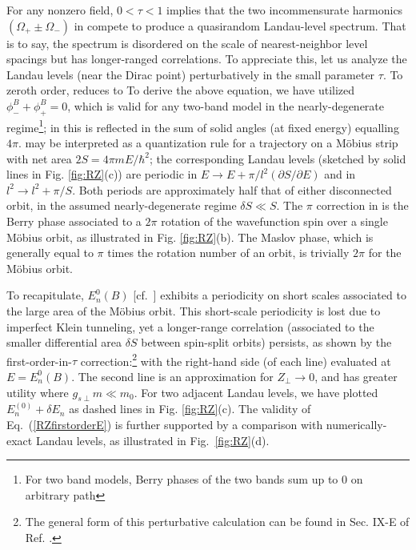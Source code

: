 \documentclass[aps, showpacs, twocolumn, notitlepage, superscriptaddress]{revtex4-1}
\begin{document}
For any nonzero field, $0{<}\tau{<}1$ implies that the two incommensurate harmonics $(\Omega_+{\pm}\Omega_-)$ in  compete to produce a quasirandom Landau-level spectrum\cite{kaganov_coherent_1983}. That is to say, the spectrum is disordered on the scale of nearest-neighbor level spacings but has longer-ranged correlations. To appreciate this, let us analyze the Landau levels (near the Dirac point) perturbatively in the small parameter $\tau$. To zeroth order,  reduces to
To derive the above equation, we have utilized $\phi^B_-{+}\phi^B_+{=}0$, which is valid for any two-band model in the nearly-degenerate regime\footnote{For two band models, Berry phases of the two bands sum up to 0 on arbitrary path}; in  this is reflected in the sum of solid angles (at fixed energy) equalling $4\pi$.  may be interpreted as a quantization rule for a trajectory on a M\"obius strip  with net area $2S{=}4\pi m E{/\hbar^2}$; the corresponding Landau levels (sketched by solid lines in Fig. \ref{fig:RZ}(c)) are periodic in $E{\rightarrow}E{+}\pi/l^2(\partial S/\partial E)$ and in $l^2{\rightarrow}l^2{+}\pi/S$. Both periods are approximately half that of either disconnected orbit, in the assumed nearly-degenerate regime $\delta S{\ll}S$. The $\pi$ correction in  is the Berry phase associated to a $2\pi$ rotation of the wavefunction spin over a single M\"obius orbit, as illustrated in Fig. \ref{fig:RZ}(b). The Maslov phase, which is generally equal to $\pi$ times the rotation number of an orbit, is trivially $2\pi$ for the M\"obius orbit.

To recapitulate, $E_n^0(B)$ [cf.\ ] exhibits a periodicity on short scales associated to the large area of the M\"obius orbit. This short-scale periodicity is lost due to  imperfect Klein tunneling, yet a longer-range correlation (associated to the smaller differential area $\delta S$ between spin-split orbits) persists, as shown by the first-order-in-$\tau$ correction:\footnote{The general form of this perturbative calculation can be found in Sec. IX-E of Ref. .} 
with the right-hand side (of each line) evaluated at $E{=}E_n^0(B)$. The second line is an approximation for $Z_{\perp}{\rightarrow}0$, and has greater utility where $g_{s\perp}m{\ll}m_0$. For two adjacent Landau levels, we have plotted $E_n^{(0)}+\delta E_n$ as dashed lines in Fig. \ref{fig:RZ}(c). The validity of Eq.\ (\ref{RZfirstorderE}) is further supported by a comparison with numerically-exact Landau levels, as illustrated in Fig.\ \ref{fig:RZ}(d).
\end{document}
